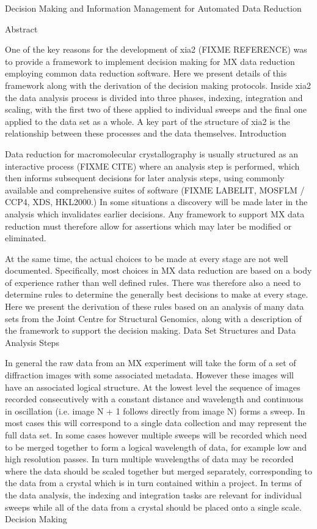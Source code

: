 Decision Making and Information Management for Automated Data Reduction

Abstract


One of the key reasons for the development of xia2 (FIXME REFERENCE) was to provide a framework to implement decision making for MX data reduction employing common data reduction software. Here we present details of this framework along with the derivation of the decision making protocols. Inside xia2 the data analysis process is divided into three phases, indexing, integration and scaling, with the first two of these applied to individual sweeps and the final one applied to the data set as a whole. A key part of the structure of xia2 is the relationship between these processes and the data themselves.
Introduction

Data reduction for macromolecular crystallography is usually structured as an interactive process (FIXME CITE) where an analysis step is performed, which then informs subsequent decisions for later analysis steps, using commonly available and comprehensive suites of software (FIXME LABELIT, MOSFLM / CCP4, XDS, HKL2000.) In some situations a discovery will be made later in the analysis which invalidates earlier decisions. Any framework to support MX data reduction must therefore allow for assertions which may later be modified or eliminated. 

At the same time, the actual choices to be made at every stage are not well documented. Specifically, most choices in MX data reduction are based on a body of experience rather than well defined rules. There was therefore also a need to determine rules to determine the generally best decisions to make at every stage. Here we present the derivation of these rules based on an analysis of many data sets from the Joint Centre for Structural Genomics, along with a description of the framework to support the decision making.
Data Set Structures and Data Analysis Steps

In general the raw data from an MX experiment will take the form of a set of diffraction images with some associated metadata. However these images will have an associated logical structure. At the lowest level the sequence of images recorded consecutively with a constant distance and wavelength and continuous in oscillation (i.e. image N + 1 follows directly from image N) forms a sweep. In most cases this will correspond to a single data collection and may represent the full data set. In some cases however multiple sweeps will be recorded which need to be merged together to form a logical wavelength of data, for example low and high resolution passes. In turn multiple wavelengths of data may be recorded where the data should be scaled together but merged separately, corresponding to the data from a crystal which is in turn contained within a project. In terms of the data analysis, the indexing and integration tasks are relevant for individual sweeps while all of the data from a crystal should be placed onto a single scale. 
Decision Making

